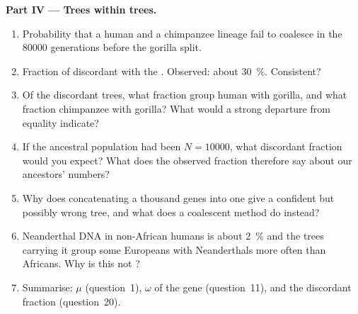 \begin{problem}
\medskip
\noindent\textbf{Part IV --- Trees within trees.}
\begin{enumerate}[resume]
  \item Probability that a human and a chimpanzee lineage fail to
        coalesce in the \num{80000} generations before the gorilla split.
  \item Fraction of  discordant with the .
        Observed: about \qty{30}{\%}. Consistent?
  \item Of the discordant trees, what fraction group human with
        gorilla, and what fraction chimpanzee with gorilla? What would a
        strong departure from equality indicate?
  \item If the ancestral population had been $N = \num{10000}$, what
        discordant fraction would you expect? What does the observed
        fraction therefore say about our ancestors' numbers?
  \item Why does concatenating a thousand genes into one  give
        a confident but possibly wrong tree, and what does a coalescent
        method do instead?
  \item Neanderthal DNA in non-African humans is about \qty{2}{\%} and
        the trees carrying it group some Europeans with Neanderthals more
        often than Africans. Why is this not ?
  \item Summarise: $\mu$ (question~1), $\omega$ of the gene
        (question~11), and the discordant fraction (question~20).
\end{enumerate}
\end{problem}
